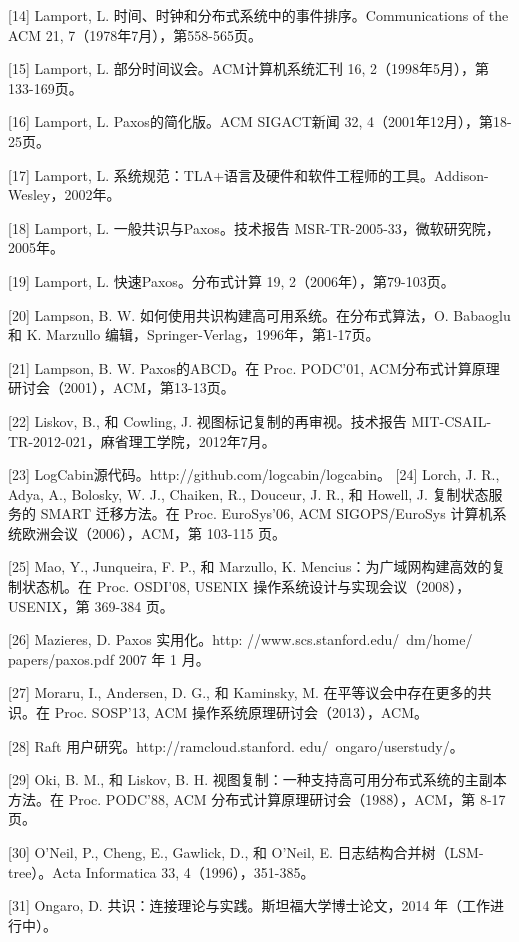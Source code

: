 \documentclass[12pt,a4paper]{report} %
\begin{document}
[14] Lamport, L. 时间、时钟和分布式系统中的事件排序。Communications of the ACM 21, 7（1978年7月），第558-565页。

[15] Lamport, L. 部分时间议会。ACM计算机系统汇刊 16, 2（1998年5月），第133-169页。

[16] Lamport, L. Paxos的简化版。ACM SIGACT新闻 32, 4（2001年12月），第18-25页。

[17] Lamport, L. 系统规范：TLA+语言及硬件和软件工程师的工具。Addison-Wesley，2002年。

[18] Lamport, L. 一般共识与Paxos。技术报告 MSR-TR-2005-33，微软研究院，2005年。

[19] Lamport, L. 快速Paxos。分布式计算 19, 2（2006年），第79-103页。

[20] Lampson, B. W. 如何使用共识构建高可用系统。在分布式算法，O. Babaoglu 和 K. Marzullo 编辑，Springer-Verlag，1996年，第1-17页。

[21] Lampson, B. W. Paxos的ABCD。在 Proc. PODC'01, ACM分布式计算原理研讨会（2001），ACM，第13-13页。

[22] Liskov, B., 和 Cowling, J. 视图标记复制的再审视。技术报告 MIT-CSAIL-TR-2012-021，麻省理工学院，2012年7月。

[23] LogCabin源代码。http://github.com/logcabin/logcabin。
[24] Lorch, J. R., Adya, A., Bolosky, W. J., Chaiken, R., Douceur, J. R., 和 Howell, J. 复制状态服务的 SMART 迁移方法。在 Proc. EuroSys'06, ACM SIGOPS/EuroSys 计算机系统欧洲会议（2006），ACM，第 103-115 页。

[25] Mao, Y., Junqueira, F. P., 和 Marzullo, K. Mencius：为广域网构建高效的复制状态机。在 Proc. OSDI'08, USENIX 操作系统设计与实现会议（2008），USENIX，第 369-384 页。

[26] Mazieres, D. Paxos 实用化。http: //www.scs.stanford.edu/~dm/home/ papers/paxos.pdf 2007 年 1 月。

[27] Moraru, I., Andersen, D. G., 和 Kaminsky, M. 在平等议会中存在更多的共识。在 Proc. SOSP'13, ACM 操作系统原理研讨会（2013），ACM。

[28] Raft 用户研究。http://ramcloud.stanford. edu/~ongaro/userstudy/。

[29] Oki, B. M., 和 Liskov, B. H. 视图复制：一种支持高可用分布式系统的主副本方法。在 Proc. PODC'88, ACM 分布式计算原理研讨会（1988），ACM，第 8-17 页。

[30] O'Neil, P., Cheng, E., Gawlick, D., 和 O'Neil, E. 日志结构合并树（LSM-tree）。Acta Informatica 33, 4（1996），351-385。

[31] Ongaro, D. 共识：连接理论与实践。斯坦福大学博士论文，2014 年（工作进行中）。
\end{document}
